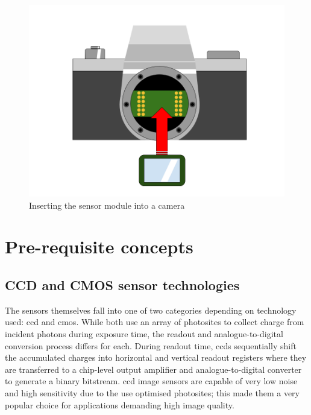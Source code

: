 \documentclass[a4paper]{report}
\begin{document}
\begin{figure}
  \centering
  \includegraphics[width=1\textwidth]{sensor_module.png}
  \caption{Inserting the sensor module into a camera}
  \label{fig:sensor_module}
\end{figure}

\section{Pre-requisite concepts}

\subsection{CCD and CMOS sensor technologies}

The sensors themselves fall into one of two categories depending on technology used: \gls{ccd} and \gls{cmos}. While both use an array of photosites to collect charge from incident photons during exposure time, the readout and analogue-to-digital conversion process differs for each. During readout time, \glspl{ccd} sequentially shift the accumulated charges into horizontal and vertical readout registers where they are transferred to a chip-level output amplifier and analogue-to-digital converter to generate a binary bitstream. \gls{ccd} image sensors are capable of very low noise and high sensitivity due to the use optimised photosites; this made them a very popular choice for applications demanding high image quality.
\end{document}
